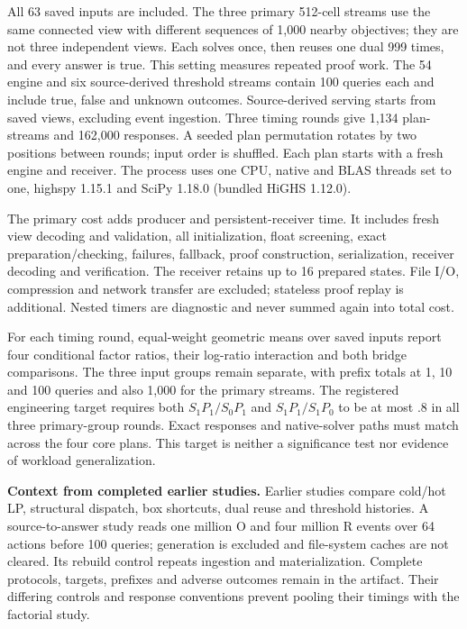 \documentclass[conference]{IEEEtran}
\begin{document}
All 63 saved inputs are included. The three primary 512-cell streams use the same connected view with different sequences of 1,000 nearby objectives; they are not three independent views. Each solves once, then reuses one dual 999 times, and every answer is true. This setting measures repeated proof work. The 54 engine and six source-derived threshold streams contain 100 queries each and include true, false and unknown outcomes. Source-derived serving starts from saved views, excluding event ingestion. Three timing rounds give 1,134 plan-streams and 162,000 responses. A seeded plan permutation rotates by two positions between rounds; input order is shuffled. Each plan starts with a fresh engine and receiver. The process uses one CPU, native and BLAS threads set to one, highspy 1.15.1 and SciPy 1.18.0 (bundled HiGHS 1.12.0).

The primary cost adds producer and persistent-receiver time. It includes fresh view decoding and validation, all initialization, float screening, exact preparation/checking, failures, fallback, proof construction, serialization, receiver decoding and verification. The receiver retains up to 16 prepared states. File I/O, compression and network transfer are excluded; stateless proof replay is additional. Nested timers are diagnostic and never summed again into total cost.

For each timing round, equal-weight geometric means over saved inputs report four conditional factor ratios, their log-ratio interaction and both bridge comparisons. The three input groups remain separate, with prefix totals at 1, 10 and 100 queries and also 1,000 for the primary streams. The registered engineering target requires both $S_1P_1/S_0P_1$ and $S_1P_1/S_1P_0$ to be at most $.8$ in all three primary-group rounds. Exact responses and native-solver paths must match across the four core plans. This target is neither a significance test nor evidence of workload generalization.

\textbf{Context from completed earlier studies.}
Earlier studies compare cold/hot LP, structural dispatch, box shortcuts, dual reuse and threshold histories. A source-to-answer study reads one million O and four million R events over 64 actions before 100 queries; generation is excluded and file-system caches are not cleared. Its rebuild control repeats ingestion and materialization. Complete protocols, targets, prefixes and adverse outcomes remain in the artifact. Their differing controls and response conventions prevent pooling their timings with the factorial study.
\end{document}
